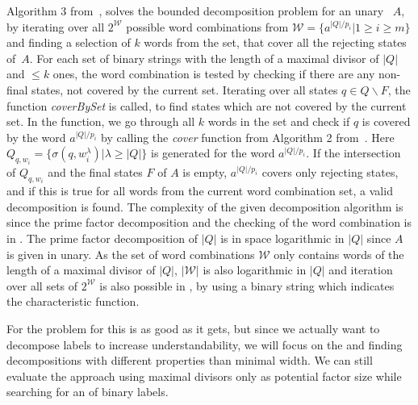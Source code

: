 Algorithm 3 from~\cite{DBLP:journals/corr/abs-2107-04683}, solves the bounded decomposition problem for an unary \DFA~$A$, by iterating over all $2^\mathcal{W}$ possible word combinations from  $\mathcal{W} = \{a^{|Q|/p_i} | 1 \geq i \geq m\}$ and finding a selection of $k$ words from the set, that cover all the rejecting states of~$A$.
For each set of binary strings with the length of a maximal divisor of $|Q|$ and $\leq k$ ones, the word combination is tested by checking if there are any non-final states, not covered by the current set.
Iterating over all states $q \in Q \backslash F$, the function \textit{coverBySet} is called, to find states which are not covered by the current set.
In the function, we go through all $k$ words in the set and check if $q$ is covered by the word $a^{|Q|/p_i}$ by calling the \textit{cover} function from Algorithm 2 from~\cite{DBLP:journals/corr/abs-2107-04683}. Here $Q_{q,w_i} = \{\sigma(q,w^\lambda_i)|\lambda \geq |Q|\}$ is generated for the word $a^{|Q|/p_i}$.
If the intersection of $Q_{q,w_i}$ and the final states $F$ of $A$ is empty, $a^{|Q|/p_i}$ covers only rejecting states, and if this is true for all words from the current word combination set, a valid decomposition is found.
The complexity of the given decomposition algorithm is \LogSpace since the prime factor decomposition and the checking of the word combination is in \LogSpace.
The prime factor decomposition of $|Q|$ is in space logarithmic in $|Q|$ since $A$ is given in unary.
As the set of word combinations $\mathcal{W}$ only contains words of the length of a maximal divisor of $|Q|$, $|\mathcal{W}|$ is also logarithmic in $|Q|$ and iteration over all sets of $2^\mathcal{W}$ is also possible in \LogSpace, by using a binary string which indicates the characteristic function.

For the \andDecomp problem for \DFAs this is as good as it gets, but since we actually want to decompose labels to increase understandability, we will focus on the \orDecomp and finding decompositions with different properties than minimal width. We can still evaluate the approach using maximal divisors only as potential factor size while searching for an \orDecomp of binary labels.
